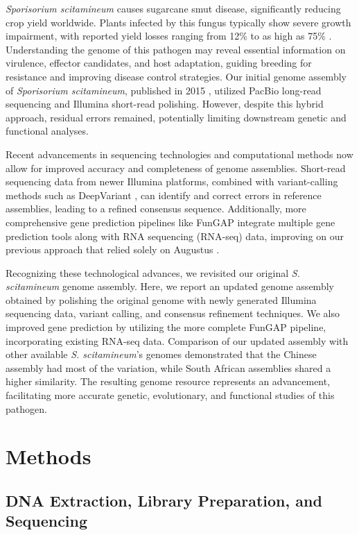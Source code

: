 \documentclass[Journal,letterpaper]{theme}
\begin{document}
\textit{Sporisorium scitamineum} causes sugarcane smut disease,
significantly reducing crop yield worldwide. Plants infected by this
fungus typically show severe growth impairment, with reported yield
losses ranging from 12\% to as high as 75\% \cite{Rajput2024}.
Understanding the genome of this pathogen may reveal essential
information on virulence, effector candidates, and host adaptation,
guiding breeding for resistance and improving disease control
strategies. Our initial genome assembly of \textit{Sporisorium
scitamineum}, published in 2015 \cite{sscita2015}, utilized PacBio
long-read sequencing and Illumina short-read polishing. However,
despite this hybrid approach, residual errors remained, potentially
limiting downstream genetic and functional analyses.

Recent advancements in sequencing technologies and computational
methods now allow for improved accuracy and completeness of genome
assemblies. Short-read sequencing data from newer Illumina platforms,
combined with variant-calling methods such as DeepVariant
\cite{deepvariant2018}, can identify and correct errors in reference
assemblies, leading to a refined consensus sequence. Additionally,
more comprehensive gene prediction pipelines like FunGAP
\cite{fungap} integrate multiple gene prediction tools along with RNA
sequencing (RNA-seq) data, improving on our previous approach that
relied solely on Augustus \cite{augustus2006}.

Recognizing these technological advances, we revisited our original
\textit{S. scitamineum} genome assembly. Here, we report an updated
genome assembly obtained by polishing the original genome with newly
generated Illumina sequencing data, variant calling, and consensus
refinement techniques. We also improved gene prediction by utilizing
the more complete FunGAP pipeline, incorporating existing RNA-seq
data. Comparison of our updated assembly with other available
\textit{S. scitamineum}'s genomes demonstrated that the Chinese
assembly \cite{refencegenome} had most of the variation, while South
African assemblies shared a higher similarity.
The resulting genome resource represents an advancement, facilitating
more accurate genetic, evolutionary, and functional studies of this pathogen.

\section*{Methods}

\subsection*{DNA Extraction, Library Preparation, and Sequencing}
\end{document}
